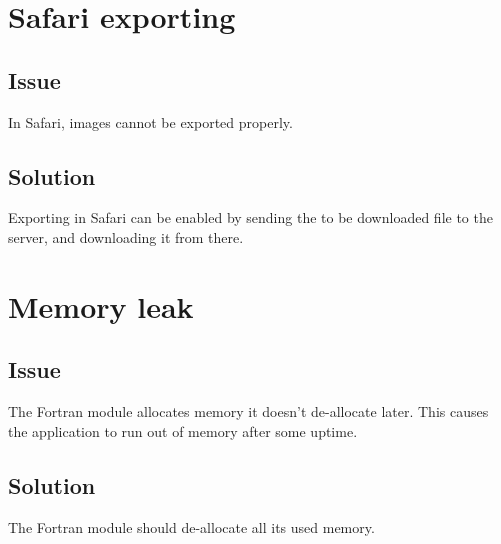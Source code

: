 \section{Safari exporting}

\subsection*{Issue}
In Safari, images cannot be exported properly.

\subsection*{Solution}
Exporting in Safari can be enabled by sending the to be downloaded file to the server, and downloading it from there.

\section{Memory leak}

\subsection*{Issue}
The Fortran module allocates memory it doesn't de-allocate later. This causes the application to run out of memory after some uptime.

\subsection*{Solution}
The Fortran module should de-allocate all its used memory.